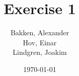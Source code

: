 \newcommand{\mytitle}{Exercise 1}
\newcommand{\mygroupnumber}{5}
\newcommand{\myauthor}{Bakken, Alexander\\Hov, Einar\\Lindgren, Joakim}

\title{\mytitle}
\author{\myauthor}
\date{\today}
